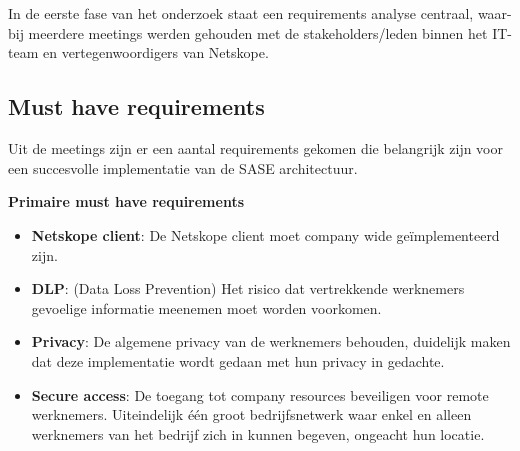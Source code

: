 
\chapter{}%
\label{ch:requirements analyse}

In de eerste fase van het onderzoek staat een requirements analyse centraal, waar-
bij meerdere meetings werden gehouden met de stakeholders/leden
binnen het IT-team en vertegenwoordigers van Netskope.

\section{Must have requirements}
Uit de meetings zijn er een aantal requirements gekomen die belangrijk zijn voor een succesvolle implementatie van de SASE architectuur.

\vspace{2ex}

\textbf{Primaire must have requirements}
\begin{itemize}
  \item \textbf{Netskope client}: De Netskope client moet company wide geïmplementeerd zijn. 
  \item \textbf{DLP}: (Data Loss Prevention) Het risico dat vertrekkende werknemers gevoelige informatie meenemen moet worden voorkomen.
  \item \textbf{Privacy}: De algemene privacy van de werknemers behouden, duidelijk maken dat deze implementatie wordt gedaan met hun privacy in gedachte.
  \item \textbf{Secure access}: De toegang tot company resources beveiligen voor remote werknemers. Uiteindelijk één groot bedrijfsnetwerk waar enkel en alleen werknemers van het bedrijf zich in kunnen begeven, ongeacht hun locatie.
\end{itemize}

\vspace{2ex}

